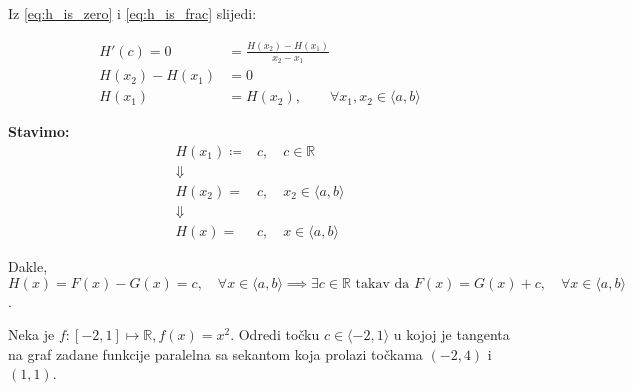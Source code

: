 \begin{multicols}{2}
Iz \ref{eq:h_is_zero} i \ref{eq:h_is_frac} slijedi:

\begin{align*}
H'(c) = 0 &= \frac{H(x_2)-H(x_1)}{x_2-x_1}\\
H(x_2)-H(x_1) &= 0\\
H(x_1) &= H(x_2),\qquad\forall x_1, x_2\in \langle a,b \rangle
\end{align*}

\noindent
\textbf{Stavimo:}
\begin{align*}
    H(x_1)\coloneq& c,\quad c\in\mathbb{R}\\
    \Downarrow&\\
    H(x_2)=&c,\quad x_2\in\langle a,b \rangle\\
    \Downarrow&\\
    H(x)=&c,\quad x\in\langle a,b \rangle
\end{align*}

\noindent
Dakle, $H(x) = F(x)-G(x)=c,\quad\forall x\in \langle a,b \rangle\implies\exists c\in\mathbb{R}\text{ takav da }F(x)=G(x)+c,\quad \forall x\in \langle a,b \rangle$.

\end{multicols}

\begin{examplebox}
    Neka je $f:[-2,1] \mapsto \mathbb{R}, f(x) = x^2$.
    Odredi točku $c\in\langle -2,1 \rangle$ u kojoj je tangenta na graf zadane
    funkcije paralelna sa sekantom koja prolazi točkama $(-2,4)$ i $(1,1)$.
\end{examplebox}
